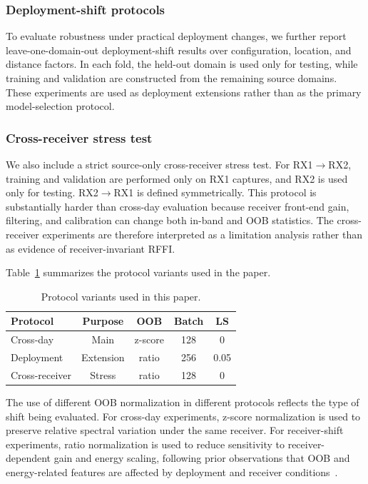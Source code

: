 \subsubsection{Deployment-shift protocols}

To evaluate robustness under practical deployment changes, we further report leave-one-domain-out deployment-shift results over configuration, location, and distance factors. In each fold, the held-out domain is used only for testing, while training and validation are constructed from the remaining source domains. These experiments are used as deployment extensions rather than as the primary model-selection protocol.

\subsubsection{Cross-receiver stress test}

We also include a strict source-only cross-receiver stress test. For RX1$\rightarrow$RX2, training and validation are performed only on RX1 captures, and RX2 is used only for testing. RX2$\rightarrow$RX1 is defined symmetrically. This protocol is substantially harder than cross-day evaluation because receiver front-end gain, filtering, and calibration can change both in-band and OOB statistics. The cross-receiver experiments are therefore interpreted as a limitation analysis rather than as evidence of receiver-invariant RFFI.

Table~\ref{tab:protocol_variants} summarizes the protocol variants used in the paper.

\begin{table}[!t]
\centering
\caption{Protocol variants used in this paper.}
\label{tab:protocol_variants}
\footnotesize
\setlength{\tabcolsep}{3.5pt}
\renewcommand{\arraystretch}{1.05}
\begin{tabular}{@{}lcccc@{}}
\toprule
Protocol & Purpose & OOB & Batch & LS \\
\midrule
Cross-day & Main & z-score & 128 & 0 \\
Deployment & Extension & ratio & 256 & 0.05 \\
Cross-receiver & Stress & ratio & 128 & 0 \\
\bottomrule
\end{tabular}
\end{table}

The use of different OOB normalization in different protocols reflects the type of shift being evaluated. For cross-day experiments, z-score normalization is used to preserve relative spectral variation under the same receiver. For receiver-shift experiments, ratio normalization is used to reduce sensitivity to receiver-dependent gain and energy scaling, following prior observations that OOB and energy-related features are affected by deployment and receiver conditions~\cite{hamdaoui2022deeplearning}.

